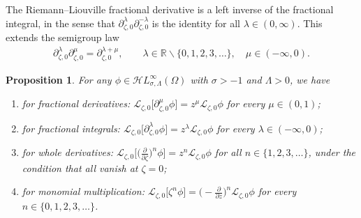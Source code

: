 \documentclass[10pt,a4paper]{amsart}
\newcommand{\singexp}[2]{\mathcal{H}L^\infty_{#1, #2}}
\newcommand{\R}{\mathbb{R}}
\newcommand{\fracderiv}[3]{\partial^{#1}_{#2, #3}}
\newcommand{\laplace}{\mathcal{L}}
\numberwithin{equation}{section}
\newtheorem{Proposition}[Theorem]{Proposition}
 { \theoremstyle{definition}
\newtheorem{Definition}[Theorem]{Definition}
\newtheorem{Remark}[Theorem]{Remark}
\newtheorem*{notation*}{Notation}
}
\begin{document}
The Riemann--Liouville fractional derivative is a left inverse of the fractional integral, in the sense that $\fracderiv{\lambda}{\zeta}{ 0} \fracderiv{-\lambda}{\zeta}{0}$ is the identity for all $\lambda \in (0, \infty)$. This extends the semigroup law
\begin{align*}
\fracderiv{\lambda}{\zeta}{0} \fracderiv{\mu}{\zeta}{0} = \fracderiv{\lambda+\mu}{\zeta}{0} ,\qquad \lambda \in \R \smallsetminus \{0, 1, 2, 3, \dots\},\quad\mu \in (-\infty, 0).
\end{align*}
\begin{Proposition}\label{prop:L-int-op}
For any $\phi\in\singexp{\sigma}{\Lambda}(\Omega)$ with $\sigma>-1$ and $\Lambda>0$, we have
\begin{enumerate}[label=(\roman*)]\itemsep=0pt
\item[$(1)$] %
for fractional derivatives:
$\laplace_{\zeta,0} \bigl[\fracderiv{\mu}{\zeta}{0} \phi\bigr] = z^{\mu} \laplace_{\zeta,0} \phi$ for every $\mu\in(0,1)$;
\item[$(2)$] %
for fractional integrals:
$\laplace_{\zeta,0} \bigl[\fracderiv{\lambda}{\zeta}{0} \phi\bigr] = z^{\lambda} \laplace_{\zeta,0} \phi$ for every $\lambda\in(-\infty,0)$;
\item[$(3)$] %
for whole derivatives:
$\laplace_{\zeta,0} \bigl[\bigl(\frac{\partial}{\partial\zeta}\bigr)^n \phi\bigr] = z^{n} \laplace_{\zeta,0} \phi$ for all $n\in\{1, 2, 3, \dots\}$, under the condition that  all vanish at $\zeta = 0$;
\item[$(4)$] %
for monomial multiplication:
$\laplace_{\zeta,0} \bigl[\zeta^n \phi\bigr] = \bigl(-\frac{\partial}{\partial z}\bigr)^n \laplace_{\zeta,0} \phi$ for every $n\in\{0,1,2,3,\dots\}$.
\end{enumerate}
\end{Proposition}
\end{document}
